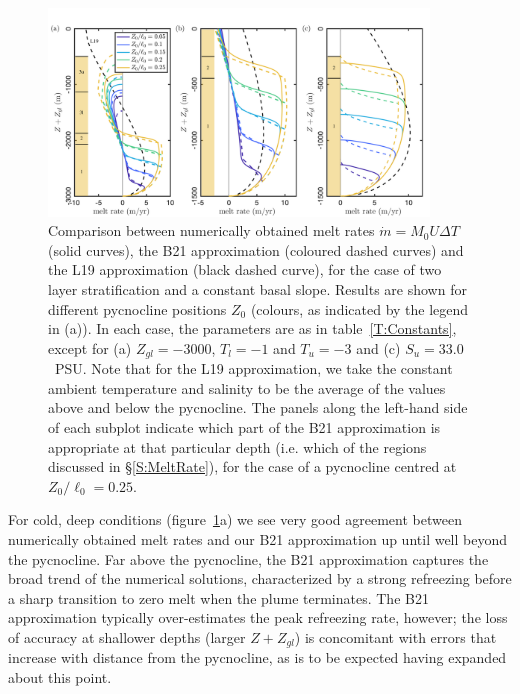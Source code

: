 \documentclass[openacc]{rsproca_new}%
\begin{document}
\begin{figure}
\centering
\includegraphics[width = 0.9\textwidth]{Submitted_PRSA/make_plots/plots/figure7.pdf}
\caption{Comparison between numerically obtained melt rates $\dot{m}= M_0 U \Delta T$ (solid curves), the B21 approximation (coloured dashed curves) and the L19 approximation (black dashed curve), for the case of two layer stratification and a constant basal slope. Results are shown for different pycnocline positions $Z_0$ (colours, as indicated by the legend in (a)). In each case, the parameters are as in table~\ref{T:Constants}, except for (a) $Z_{gl} = -3000$, $T_l = -1$ and $T_u = -3$ and (c)  $S_u = 33.0$~PSU. Note that for the L19 approximation, we take the constant ambient temperature and salinity to be the average of the values above and below the pycnocline. The panels along the left-hand side of each subplot indicate which part of the B21 approximation is appropriate at that particular depth (i.e. which of the regions discussed in \S\ref{S:MeltRate}), for the case of a pycnocline centred at $Z_0/\ell_0 = 0.25$.}\label{fig:Numerics:PycnoclinePosition}
\end{figure}

For cold, deep conditions (figure~\ref{fig:Numerics:PycnoclinePosition}a) we see very good agreement between numerically obtained melt rates and our B21 approximation up until well beyond the pycnocline. Far above the pycnocline, the B21 approximation captures the broad trend of the numerical solutions, characterized by a strong refreezing before a sharp transition to zero melt when the plume terminates. The B21 approximation typically over-estimates the peak refreezing rate, however; the loss of accuracy at shallower depths (larger $Z + Z_{gl}$) is concomitant with errors that increase with distance from the pycnocline, as is to be expected having expanded about this point.
\end{document}
